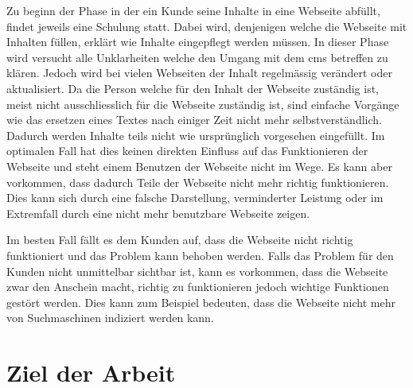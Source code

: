 Zu beginn der Phase in der ein Kunde seine Inhalte in eine Webseite abfüllt, findet jeweils eine Schulung statt. Dabei wird, denjenigen welche die Webseite mit Inhalten füllen, erklärt wie Inhalte eingepflegt werden müssen. In dieser Phase wird versucht alle Unklarheiten welche den Umgang mit dem \ac{cms} betreffen zu klären. Jedoch wird bei vielen Webseiten der Inhalt regelmässig verändert oder aktualisiert. Da die Person welche für den Inhalt der Webseite zuständig ist, meist nicht ausschliesslich für die Webseite zuständig ist, sind einfache Vorgänge wie das ersetzen eines Textes nach einiger Zeit nicht mehr selbstverständlich. Dadurch werden Inhalte teils nicht wie ursprünglich vorgesehen eingefüllt. Im optimalen Fall hat dies keinen direkten Einfluss auf das Funktionieren der Webseite und steht einem Benutzen der Webseite nicht im Wege. Es kann aber vorkommen, dass dadurch Teile der Webseite nicht mehr richtig funktionieren. Dies kann sich durch eine falsche Darstellung, verminderter Leistung oder im Extremfall durch eine nicht mehr benutzbare Webseite zeigen.

Im besten Fall fällt es dem Kunden auf, dass die Webseite nicht richtig funktioniert und das Problem kann behoben werden. Falls das Problem für den Kunden nicht unmittelbar sichtbar ist, kann es vorkommen, dass die Webseite zwar den Anschein macht, richtig zu funktionieren jedoch wichtige Funktionen gestört werden. Dies kann zum Beispiel bedeuten, dass die Webseite nicht mehr von Suchmaschinen indiziert werden kann.

\section{Ziel der Arbeit}
\label{sec:ziel_der_arbeit}
